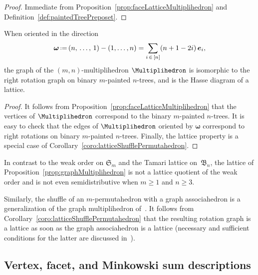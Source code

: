 \documentclass[AHL,Unicode,longabstracts,published]{cedram}
\renewcommand{\b}[1]{\boldsymbol{#1}}
\newcommand{\f}[1]{\mathfrak{#1}}
\newcommand{\eqdef}{\mbox{\,\raisebox{0.2ex}{\scriptsize\ensuremath{\mathrm:}}\ensuremath{=}\,}}
\begin{document}
\begin{proof}
Immediate from Proposition~\ref{prop:faceLatticeMultiplihedron} and Definition~\ref{def:paintedTreePreposet}.
\end{proof}

\begin{prop}\label{prop:graphMultiplihedron}
When oriented in the direction
\[
{\b{\omega} \eqdef (n,\,\dots,\,1) - (1,\dots,n) = \sum_{i\,\in\,[n]} (n+1-2i) \, \b{e}_i},
\]
the graph of the $(m,n)$-multiplihedron $\Multiplihedron$ is isomorphic to the right rotation graph on binary $m$-painted $n$-trees, and is the Hasse diagram of a lattice.
\end{prop}

\begin{proof}
It follows from Proposition~\ref{prop:faceLatticeMultiplihedron} that the vertices of $\Multiplihedron$ correspond to the binary $m$-painted $n$-trees. It is easy to check that the edges of $\Multiplihedron$ oriented by $\b{\omega}$ correspond to right rotations on binary $m$-painted $n$-trees. Finally, the lattice property is a special case of Corollary~\ref{coro:latticeShufflePermutahedron}.
\end{proof}

\begin{rema}\label{rem:notSemidistributive}
In contrast to the weak order on $\f{S}_m$ and the Tamari lattice on~$\f{B}_n$, the lattice of Proposition~\ref{prop:graphMultiplihedron} is not a lattice quotient of the weak order and is not even semidistributive when $m \ge 1$ and $n \ge 3$.
\end{rema}

\begin{rema}\label{rem:graphMultiplihedra}
Similarly, the shuffle of an $m$-permutahedron with a graph associahedron is a generalization of the graph multiplihedron of~\cite{DevadossForcey}. It follows from Corollary~\ref{coro:latticeShufflePermutahedron} that the resulting rotation graph is a lattice as soon as the graph associahedron is a lattice (necessary and sufficient conditions for the latter are discussed in~\cite{BarnardMcConville}).
\end{rema}



\subsection{Vertex, facet, and Minkowski sum descriptions}\label{subsec:vertexFacetMinkowskiDescriptionsMultiplihedra}
\end{document}
